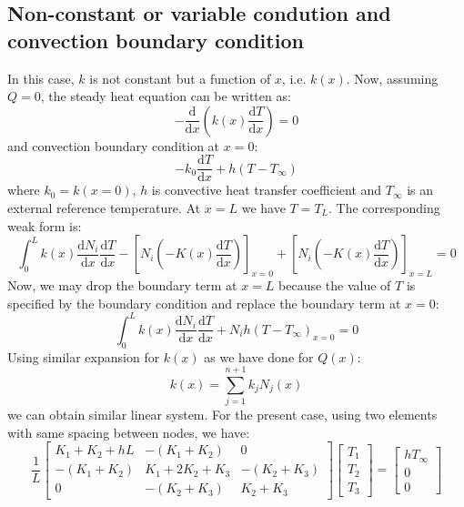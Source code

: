 \documentclass[a4paper,12pt]{article} %
\begin{document}
\subsection{Non-constant or variable condution and convection boundary condition}

In this case, $k$ is not constant but a function of $x$, i.e. $k(x)$.
Now, assuming $Q=0$, the steady heat equation can be written as:
\begin{equation}
-\frac{\mathrm{d}}{\mathrm{d}x}\left(
k(x) \frac{\mathrm{d}T}{\mathrm{d}x} \right) = 0
\end{equation}
%
and convection boundary condition at $x=0$:
\begin{equation}
-k_{0}\frac{\mathrm{d}T}{\mathrm{d}x} + h (T - T_{\infty})
\end{equation}
where $k_{0} = k(x=0)$, $h$ is convective heat transfer coefficient and
$T_{\infty}$ is an external reference temperature.
At $x=L$ we have $T = T_{L}$.
%
The corresponding weak form is:
\begin{equation}
\int_{0}^{L} k(x)\frac{\mathrm{d}N_{i}}{\mathrm{d}x}
\frac{\mathrm{d}T}{\mathrm{d}x} -
\left[ N_{i} \left( -K(x) \frac{\mathrm{d}T}{\mathrm{d}x} \right) \right]_{x=0} +
\left[ N_{i} \left( -K(x) \frac{\mathrm{d}T}{\mathrm{d}x} \right) \right]_{x=L} = 0
\end{equation}
Now, we may drop the boundary term at $x=L$ because the value of $T$ is specified
by the boundary condition and replace the boundary term at $x=0$:
\begin{equation}
\int_{0}^{L} k(x) \frac{\mathrm{d}N_{i}}{\mathrm{d}x}
\frac{\mathrm{d}T}{\mathrm{d}x} + N_{i} h (T - T_{\infty})_{x=0} = 0
\end{equation}
Using similar expansion for $k(x)$ as we have done for $Q(x)$:
\begin{equation}
k(x) = \sum_{j=1}^{n+1} k_{j} N_{j}(x)
\end{equation}
we can obtain similar linear system. For the present case, using two elements
with same spacing between nodes, we have:
\begin{equation}
\frac{1}{L}\begin{bmatrix}
K_{1} + K_{2} + hL & -(K_{1} + K_{2}) & 0 \\
-(K_{1} + K_{2}) & K_{1} + 2K_{2} + K_{3} & -(K_2 + K_3) \\
0 & -(K_{2} + K_{3}) & K_{2} + K_{3}
\end{bmatrix}\begin{bmatrix}
T_{1} \\ T_{2} \\ T_{3}
\end{bmatrix} =
\begin{bmatrix}
hT_{\infty} \\ 0 \\ 0
\end{bmatrix}
\end{equation}
\end{document}
